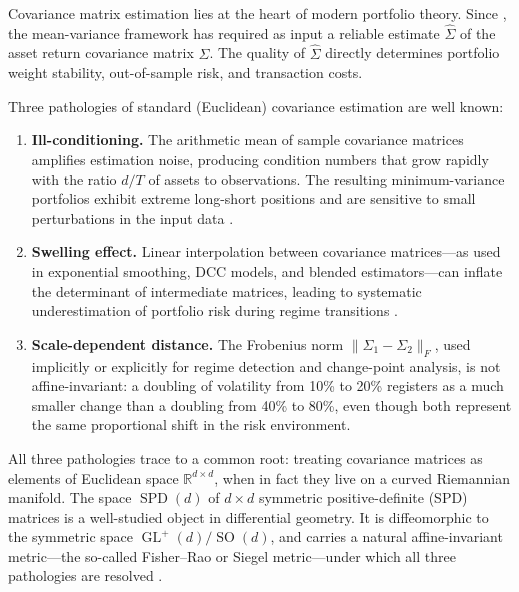 \documentclass[12pt,a4paper]{article}
\DeclareMathOperator{\GL}{GL}
\DeclareMathOperator{\SO}{SO}
\DeclareMathOperator{\SPD}{SPD}
\newcommand{\R}{\mathbb{R}}
\begin{document}
Covariance matrix estimation lies at the heart of modern portfolio theory.
Since \citet{Markowitz1952}, the mean-variance framework has required as input a
reliable estimate $\hat{\Sigma}$ of the asset return covariance matrix $\Sigma$.
The quality of $\hat{\Sigma}$ directly determines portfolio weight stability,
out-of-sample risk, and transaction costs.

Three pathologies of standard (Euclidean) covariance estimation are well known:
\begin{enumerate}[label=(\roman*)]
    \item \textbf{Ill-conditioning.} The arithmetic mean of sample covariance
    matrices amplifies estimation noise, producing condition numbers that
    grow rapidly with the ratio $d/T$ of assets to observations. The resulting
    minimum-variance portfolios exhibit extreme long-short positions and
    are sensitive to small perturbations in the input data
    \citep{LedoitWolf2004}.

    \item \textbf{Swelling effect.} Linear interpolation between covariance
    matrices---as used in exponential smoothing, DCC models, and blended
    estimators---can inflate the determinant of intermediate matrices,
    leading to systematic underestimation of portfolio risk during
    regime transitions \citep{Arsigny2006}.

    \item \textbf{Scale-dependent distance.} The Frobenius norm $\|\Sigma_1 -
    \Sigma_2\|_F$, used implicitly or explicitly for regime detection and
    change-point analysis, is not affine-invariant: a doubling of volatility
    from 10\% to 20\% registers as a much smaller change than a doubling from
    40\% to 80\%, even though both represent the same proportional shift in the
    risk environment.
\end{enumerate}

All three pathologies trace to a common root: treating covariance matrices as
elements of Euclidean space $\R^{d \times d}$, when in fact they live on a
curved Riemannian manifold. The space $\SPD(d)$ of $d \times d$ symmetric
positive-definite (SPD) matrices is a well-studied object in differential
geometry. It is diffeomorphic to the symmetric space $\GL^+(d)/\SO(d)$, and
carries a natural affine-invariant metric---the so-called Fisher--Rao or
Siegel metric---under which all three pathologies are resolved
\citep{Pennec2006,Moakher2005}.
\end{document}

